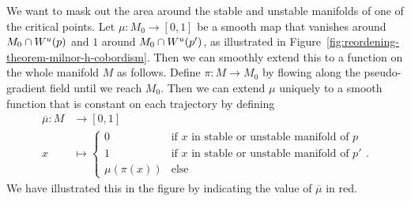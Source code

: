 \begin{myproof}
    We want to mask out the area around the stable and unstable manifolds of one of the critical points.
    Let $\mu: M_0 \to  [0,1]$ be a smooth map that vanishes around  $ M_0 \cap W^u(p)$ and $1$ around $M_0 \cap W^u(p')$, as illustrated in Figure~\ref{fig:reordening-theorem-milnor-h-cobordism}.
    Then we can smoothly extend this to a function on the whole manifold $M$ as follows.
    Define $\pi: M \to  M_0$ by flowing along the pseudo-gradient field until we reach $M_0$.
    Then we can extend $\mu$ uniquely to a smooth function that is constant on each trajectory by defining
    \begin{align*}
        \overline{\mu}: M &\longrightarrow [0,1] \\
        x &\longmapsto \begin{cases}
            0 & \text{if $x$ in stable or unstable manifold of $p$}\\
            1 & \text{if $x$ in stable or unstable manifold of $p'$}\\ 
            \mu(\pi(x)) & \text{else}
        \end{cases}
    .\end{align*}
    We have illustrated this in the figure by
    indicating the value of $\overline{\mu}$ in red.


\end{myproof}
